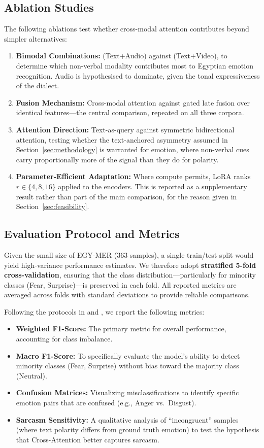 \documentclass[12pt, a4paper]{article}
\begin{document}
\subsection{Ablation Studies}
The following ablations test whether cross-modal attention contributes beyond simpler alternatives:
\begin{enumerate}
    \item \textbf{Bimodal Combinations:} (Text+Audio) against (Text+Video), to determine which non-verbal modality contributes most to Egyptian emotion recognition. Audio is hypothesised to dominate, given the tonal expressiveness of the dialect.
    \item \textbf{Fusion Mechanism:} Cross-modal attention against gated late fusion over identical features---the central comparison, repeated on all three corpora.
    \item \textbf{Attention Direction:} Text-as-query against symmetric bidirectional attention, testing whether the text-anchored asymmetry assumed in Section~\ref{sec:methodology} is warranted for emotion, where non-verbal cues carry proportionally more of the signal than they do for polarity.
    \item \textbf{Parameter-Efficient Adaptation:} Where compute permits, LoRA ranks $r \in \{4, 8, 16\}$ applied to the encoders. This is reported as a supplementary result rather than part of the main comparison, for the reason given in Section~\ref{sec:feasibility}.
\end{enumerate}

\subsection{Evaluation Protocol and Metrics}
Given the small size of EGY-MER (363 samples), a single train/test split would yield high-variance performance estimates. We therefore adopt \textbf{stratified 5-fold cross-validation}, ensuring that the class distribution---particularly for minority classes (Fear, Surprise)---is preserved in each fold. All reported metrics are averaged across folds with standard deviations to provide reliable comparisons.

Following the protocols in \citet{Hussein2025} and \citet{Rahma2023}, we report the following metrics:
\begin{itemize}
    \item \textbf{Weighted F1-Score:} The primary metric for overall performance, accounting for class imbalance.
    \item \textbf{Macro F1-Score:} To specifically evaluate the model's ability to detect minority classes (Fear, Surprise) without bias toward the majority class (Neutral).
    \item \textbf{Confusion Matrices:} Visualizing misclassifications to identify specific emotion pairs that are confused (e.g., Anger vs.\ Disgust).
    \item \textbf{Sarcasm Sensitivity:} A qualitative analysis of ``incongruent'' samples (where text polarity differs from ground truth emotion) to test the hypothesis that Cross-Attention better captures sarcasm.
\end{itemize}
\end{document}
